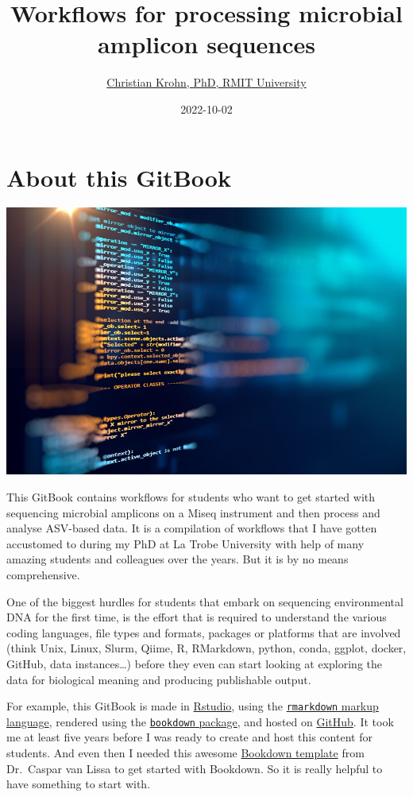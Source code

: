 \documentclass[
]{book}
\title{Workflows for processing microbial amplicon sequences}
\author{\href{https://www.rmit.edu.au/contact/staff-contacts/academic-staff/k/krohn---christian}{Christian Krohn, PhD, RMIT University}}
\date{2022-10-02}
\begin{document}
\maketitle

{
\setcounter{tocdepth}{1}
\tableofcontents
}
\hypertarget{about}{%
\chapter{About this GitBook}\label{about}}

\includegraphics{./img/data.jpeg}

This GitBook contains workflows for students who want to get started with sequencing microbial amplicons on a Miseq instrument and then process and analyse ASV-based data. It is a compilation of workflows that I have gotten accustomed to during my PhD at La Trobe University with help of many amazing students and colleagues over the years. But it is by no means comprehensive.

One of the biggest hurdles for students that embark on sequencing environmental DNA for the first time, is the effort that is required to understand the various coding languages, file types and formats, packages or platforms that are involved (think Unix, Linux, Slurm, Qiime, R, RMarkdown, python, conda, ggplot, docker, GitHub, data instances\ldots) before they even can start looking at exploring the data for biological meaning and producing publishable output.

For example, this GitBook is made in \href{https://rstudio.com}{Rstudio}, using the \href{https://rmarkdown.rstudio.com/}{\texttt{rmarkdown} markup language}, rendered using the \href{https://bookdown.org/yihui/bookdown/get-started.html}{\texttt{bookdown} package}, and hosted on \href{https://github.com/}{GitHub}. It took me at least five years before I was ready to create and host this content for students. And even then I needed this awesome \href{https://cjvanlissa.github.io/gitbook-demo/index.html}{Bookdown template} from Dr.~Caspar van Lissa to get started with Bookdown. So it is really helpful to have something to start with.
\end{document}

